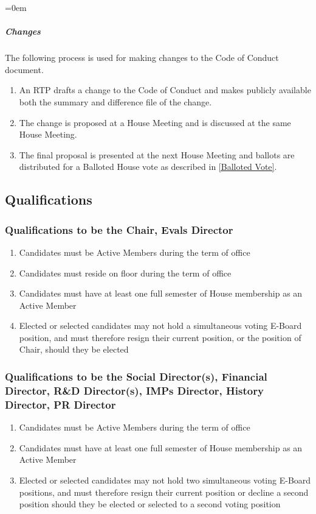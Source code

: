 \documentclass{article}
\newcommand{\asection}[1]{\subsection{#1} \label{#1}}
\newcommand{\asubsection}[1]{\subsubsection{#1} \label{#1}}
\newcommand{\asubsubsubsection}[1]{\parindent=0em\subparagraph{#1} \label{#1}}
\begin{document}
\asubsubsubsection{Changes}
The following process is used for making changes to the Code of Conduct document.
\begin{enumerate}
	\item An RTP drafts a change to the Code of Conduct and makes publicly available both the summary and difference file of the change.
	\item The change is proposed at a House Meeting and is discussed at the same House Meeting.
	\item The final proposal is presented at the next House Meeting and ballots are distributed for a Balloted House vote as described in \ref{Balloted Vote}.
\end{enumerate}

\asection{Qualifications}

\asubsection{Qualifications to be the Chair, Evals Director}
\begin{enumerate}
	\item Candidates must be Active Members during the term of office
	\item Candidates must reside on floor during the term of office
	\item Candidates must have at least one full semester of House membership as an Active Member
	\item Elected or selected candidates may not hold a simultaneous voting E-Board position, and must therefore resign their current position, or the position of Chair, should they be elected
\end{enumerate}

\subsubsection{Qualifications to be the Social Director(s), Financial Director, R\&D Director(s), IMPs Director, History Director, PR Director}
\begin{enumerate}
	\item Candidates must be Active Members during the term of office
	\item Candidates must have at least one full semester of House membership as an Active Member
	\item Elected or selected candidates may not hold two simultaneous voting E-Board positions, and must therefore resign their current position or decline a second position should they be elected or selected to a second voting position
\end{enumerate}
\end{document}
